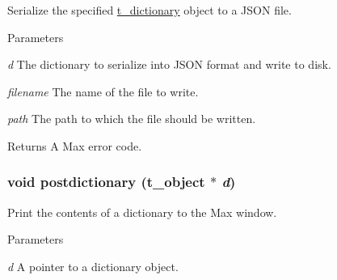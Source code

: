 Serialize the specified \hyperlink{structt__dictionary}{t\_\-dictionary} object to a JSON file. 
\begin{DoxyParams}{Parameters}
\item[{\em d}]The dictionary to serialize into JSON format and write to disk. \item[{\em filename}]The name of the file to write. \item[{\em path}]The path to which the file should be written. \end{DoxyParams}
\begin{DoxyReturn}{Returns}
A Max error code. 
\end{DoxyReturn}
\hypertarget{group__dictionary_ga7619544926e5c62caf19176ebab5b1a2}{
\subsubsection[{postdictionary}]{\setlength{\rightskip}{0pt plus 5cm}void postdictionary ({\bf t\_\-object} $\ast$ {\em d})}}
\label{group__dictionary_ga7619544926e5c62caf19176ebab5b1a2}


Print the contents of a dictionary to the Max window. 
\begin{DoxyParams}{Parameters}
\item[{\em d}]A pointer to a dictionary object. \end{DoxyParams}

